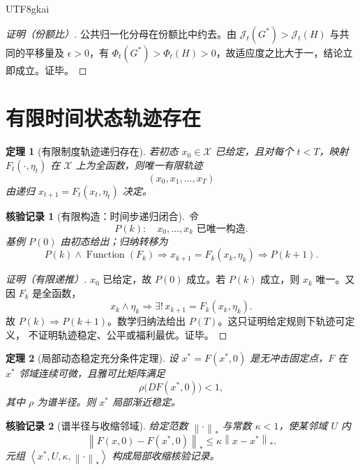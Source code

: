 \documentclass[12pt,a4paper,openany]{report}
\newtheorem{theorem}{定理}[chapter]
\newtheorem{Certificate}{核验记录}[chapter]
\newcommand{\States}{\mathcal X}
\newcommand{\Norm}[1]{\left\lVert #1\right\rVert}
\newcommand{\Tuple}[1]{\left\langle #1\right\rangle}
\begin{document}
\begin{CJK*}{UTF8}{gkai}
\begin{proof}[证明（份额比）]
公共归一化分母在份额比中约去。由 \(\mathcal J_t(G^*)>\mathcal J_t(H)\) 与共同的平移量及
\(\epsilon>0\)，有 \(\Phi_t(G^*)>\Phi_t(H)>0\)，故适应度之比大于一，结论立即成立。证毕。
\end{proof}

\section{有限时间状态轨迹存在}

\begin{theorem}[有限制度轨迹递归存在]
\label{thm:finite-governance-trajectory}
若初态 \(x_0\in\States\) 已给定，且对每个 \(t<T\)，映射 \(F_t(\cdot,\eta_t)\) 在
\(\States\) 上为全函数，则唯一有限轨迹
\[
  (x_0,x_1,\ldots,x_T)
\]
由递归 \(x_{t+1}=F_t(x_t,\eta_t)\) 决定。
\end{theorem}

\begin{Certificate}[有限构造：时间步递归闭合]
\label{cert:finite-governance-trajectory}
令
\[
  P(k):\quad x_0,\ldots,x_k\text{ 已唯一构造}.
\]
基例 \(P(0)\) 由初态给出；归纳转移为
\[
  P(k)\wedge\operatorname{Function}(F_k)
  \Longrightarrow
  x_{k+1}=F_k(x_k,\eta_k)
  \Longrightarrow P(k+1).
\]
\end{Certificate}

\begin{proof}[证明（有限递推）]
\(x_0\) 已给定，故 \(P(0)\) 成立。若 \(P(k)\) 成立，则 \(x_k\) 唯一。又因 \(F_k\) 是全函数，
\[
  x_k\wedge\eta_k
  \Longrightarrow
  \exists!\,x_{k+1}=F_k(x_k,\eta_k).
\]
故 \(P(k)\Rightarrow P(k+1)\)。数学归纳法给出 \(P(T)\)。这只证明给定规则下轨迹可定义，
不证明轨迹稳定、公平或福利最优。证毕。
\end{proof}

\begin{theorem}[局部动态稳定充分条件定理]
\label{thm:local-dynamic-stability}
设 \(x^*=F(x^*,0)\) 是无冲击固定点，\(F\) 在 \(x^*\) 邻域连续可微，且雅可比矩阵满足
\[
  \rho\bigl(DF(x^*,0)\bigr)<1,
\]
其中 \(\rho\) 为谱半径。则 \(x^*\) 局部渐近稳定。
\end{theorem}

\begin{Certificate}[谱半径与收缩邻域]
给定范数 \(\Norm{\cdot}_*\) 与常数 \(\kappa<1\)，使某邻域 \(U\) 内
\[
  \Norm{F(x,0)-F(x^*,0)}_*
  \le
  \kappa\Norm{x-x^*}_*.
\]
元组 \(\Tuple{x^*,U,\kappa,\Norm{\cdot}_*}\) 构成局部收缩核验记录。
\end{Certificate}


\end{CJK*}
\end{document}

